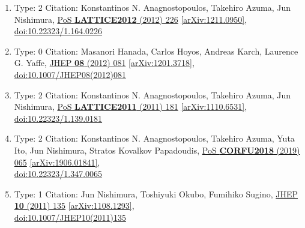 \documentclass[a4paper,10pt]{article}
\begin{document}
\begin{enumerate}
\begin{enumerate}
  \item Type: 2 Citation: Konstantinos N. Anagnostopoulos, Takehiro Azuma, Jun Nishimura, \href{https://www.doi.org/10.22323/1.164.0226}{PoS {\bf LATTICE2012} (2012) 226}  \href{https://arxiv.org/abs/1211.0950}{[arXiv:1211.0950]},\\\href{https://www.doi.org/10.22323/1.164.0226}{doi:10.22323/1.164.0226}
  \item Type: 0 Citation: Masanori Hanada, Carlos Hoyos, Andreas Karch, Laurence G. Yaffe, \href{https://www.doi.org/10.1007/JHEP08(2012)081}{JHEP {\bf 08} (2012) 081}  \href{https://arxiv.org/abs/1201.3718}{[arXiv:1201.3718]},\\\href{https://www.doi.org/10.1007/JHEP08(2012)081}{doi:10.1007/JHEP08(2012)081}
  \item Type: 2 Citation: Konstantinos N. Anagnostopoulos, Takehiro Azuma, Jun Nishimura, \href{https://www.doi.org/10.22323/1.139.0181}{PoS {\bf LATTICE2011} (2011) 181}  \href{https://arxiv.org/abs/1110.6531}{[arXiv:1110.6531]},\\\href{https://www.doi.org/10.22323/1.139.0181}{doi:10.22323/1.139.0181}
  \item Type: 2 Citation: Konstantinos N. Anagnostopoulos, Takehiro Azuma, Yuta Ito, Jun Nishimura, Stratos Kovalkov Papadoudis, \href{https://www.doi.org/10.22323/1.347.0065}{PoS {\bf CORFU2018} (2019) 065}  \href{https://arxiv.org/abs/1906.01841}{[arXiv:1906.01841]},\\\href{https://www.doi.org/10.22323/1.347.0065}{doi:10.22323/1.347.0065}
  \item Type: 1 Citation: Jun Nishimura, Toshiyuki Okubo, Fumihiko Sugino, \href{https://www.doi.org/10.1007/JHEP10(2011)135}{JHEP {\bf 10} (2011) 135}  \href{https://arxiv.org/abs/1108.1293}{[arXiv:1108.1293]},\\\href{https://www.doi.org/10.1007/JHEP10(2011)135}{doi:10.1007/JHEP10(2011)135}

\end{enumerate}
\end{enumerate}
\end{document}
